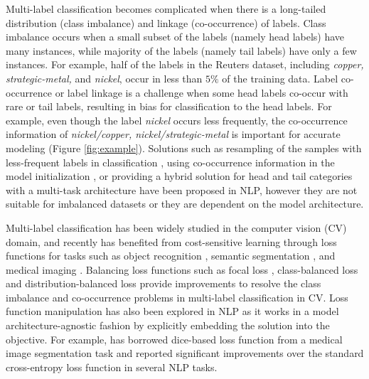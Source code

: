 \documentclass[11pt]{article}
\begin{document}
Multi-label classification becomes complicated when there is a long-tailed distribution (class imbalance) and linkage (co-occurrence) of labels. Class imbalance occurs when a small subset of the labels (namely head labels) have many instances, while majority of the labels (namely tail labels) have only a few instances. For example, half of the labels in the Reuters dataset, including \textit{copper, strategic-metal,} and \textit{nickel}, occur in less than $5\%$ of the training data. Label co-occurrence or label linkage is a challenge when some head labels co-occur with rare or tail labels, resulting in bias for classification to the head labels. For example, even though the label \textit{nickel} occurs less frequently, the co-occurrence information of \textit{nickel/copper, nickel/strategic-metal} is important for accurate modeling (Figure \ref{fig:example}). Solutions such as resampling of the samples with less-frequent labels in classification \citep{resampling_general_example, resampling_multilabel_example}, using co-occurrence information in the model initialization  \citep{kurata2016improved}, or providing a hybrid solution for head and tail categories with a multi-task architecture \citep{hscnn} have been proposed in NLP, however they are not suitable for imbalanced datasets or they are dependent on the model architecture. 

Multi-label classification has been widely studied in the computer vision (CV) domain, and recently has benefited from cost-sensitive learning through loss functions for tasks such as object recognition \citep{BCE_CV,Dice-Loss-CV}, semantic segmentation \citep{Ge_2018_CVPR}, and medical imaging  \citep{li_multi-label_2020}. Balancing loss functions such as focal loss \citep{lin2017focal}, class-balanced loss \citep{class-balanced-loss} and distribution-balanced loss \citep{DBLoss} provide improvements to resolve the class imbalance and co-occurrence problems in multi-label classification in CV.
Loss function manipulation 
has also been explored   \citep{li-etal-2020-dice, SPECTER} in NLP as it works in a model architecture-agnostic fashion by explicitly embedding the solution into the objective. For example,  \citet{li-etal-2020-dice} has borrowed dice-based loss function from a medical image segmentation task \citep{Dice-Loss-CV} and reported significant improvements over the standard cross-entropy loss function in several NLP tasks. 
\end{document}
